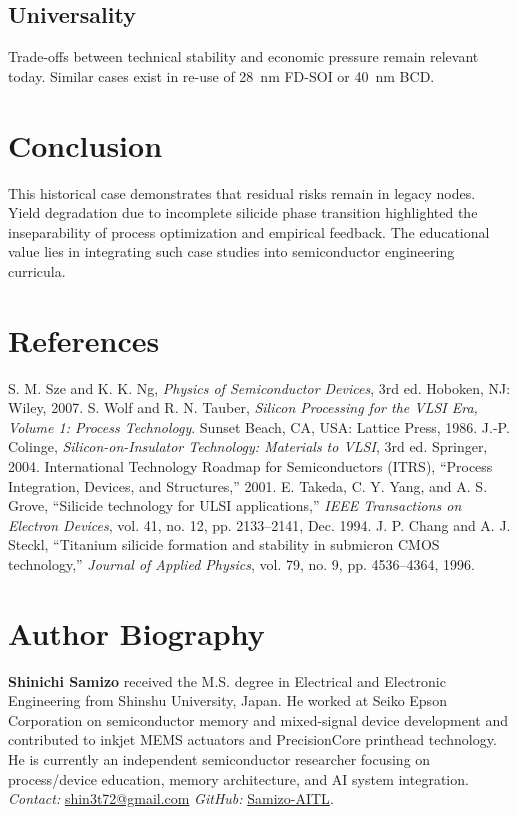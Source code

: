 \documentclass[conference]{IEEEtran}
\begin{document}
\subsection{Universality}
Trade-offs between technical stability and economic pressure remain relevant today. 
Similar cases exist in re-use of 28~nm FD-SOI or 40~nm BCD.

\section{Conclusion}
This historical case demonstrates that residual risks remain in legacy nodes. 
Yield degradation due to incomplete silicide phase transition highlighted the inseparability of process optimization and empirical feedback. 
The educational value lies in integrating such case studies into semiconductor engineering curricula.

\section*{References}
\begin{thebibliography}{99}
 S. M. Sze and K. K. Ng, \textit{Physics of Semiconductor Devices}, 3rd ed. Hoboken, NJ: Wiley, 2007.
 S. Wolf and R. N. Tauber, \textit{Silicon Processing for the VLSI Era, Volume 1: Process Technology}. Sunset Beach, CA, USA: Lattice Press, 1986.
 J.-P. Colinge, \textit{Silicon-on-Insulator Technology: Materials to VLSI}, 3rd ed. Springer, 2004.
 International Technology Roadmap for Semiconductors (ITRS), ``Process Integration, Devices, and Structures,'' 2001.
 E. Takeda, C. Y. Yang, and A. S. Grove, ``Silicide technology for ULSI applications,'' \textit{IEEE Transactions on Electron Devices}, vol. 41, no. 12, pp. 2133--2141, Dec. 1994.
 J. P. Chang and A. J. Steckl, ``Titanium silicide formation and stability in submicron CMOS technology,'' \textit{Journal of Applied Physics}, vol. 79, no. 9, pp. 4536--4364, 1996.
\end{thebibliography}

\section*{Author Biography}
\textbf{Shinichi Samizo} received the M.S. degree in Electrical and Electronic Engineering from Shinshu University, Japan. 
He worked at Seiko Epson Corporation on semiconductor memory and mixed-signal device development and contributed to inkjet MEMS actuators and PrecisionCore printhead technology. 
He is currently an independent semiconductor researcher focusing on process/device education, memory architecture, and AI system integration.\\
\emph{Contact:} \href{mailto:shin3t72@gmail.com}{shin3t72@gmail.com}\quad
\emph{GitHub:} \href{https://github.com/Samizo-AITL}{Samizo-AITL}.
\end{document}
